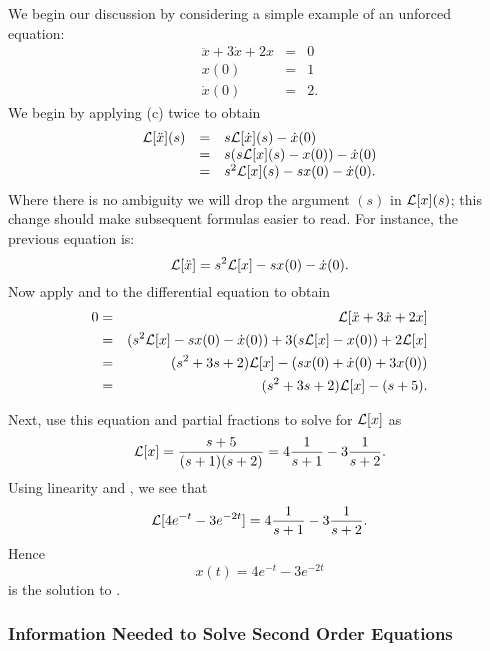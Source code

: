 \documentclass{ximera}
\begin{document}
We begin our discussion by considering a simple example of an unforced 
equation:
\begin{equation}  \label{Lexam2}
\begin{array}{rcl}
\ddot{x} + 3\dot{x} +2x & = & 0  \\
 x(0) & = & 1 \\
\dot{x}(0) & = & 2.
\end{array}
\end{equation}
We begin by applying (c) twice to obtain
\[
\begin{array}{rcl}
{\cal L}[\ddot{x}](s) & = & s{\cal L}[\dot{x}](s) - \dot{x}(0)\\
& = & s(s{\cal L}[x](s) - x(0)) - \dot{x}(0)\\
& = & s^2{\cal L}[x](s) - sx(0) - \dot{x}(0).
\end{array}
\]
Where there is no ambiguity we will drop the argument $(s)$ in 
${\cal L}[x](s)$; this change should make subsequent formulas easier 
to read.  For instance, the previous equation is:
\begin{equation}  \label{eq:dderLap}
{\cal L}[\ddot{x}] = s^2{\cal L}[x] - sx(0) - \dot{x}(0).
\end{equation}
Now apply  and  to the differential
equation  to obtain
\begin{eqnarray*}
0 & = & {\cal L}[\ddot{x} + 3\dot{x} +2x] \\
& = & (s^2{\cal L}[x] - sx(0) - \dot{x}(0)) + 
3(s{\cal L}[x] - x(0)) + 2{\cal L}[x]\\
& = & (s^2+3s+2){\cal L}[x] -(sx(0)+\dot{x}(0)+3x(0)) \\
& = & (s^2+3s+2){\cal L}[x] - (s+5).
\end{eqnarray*}

Next, use this equation and partial fractions to solve for ${\cal L}[x]$ as
\[
\displaystyle{\cal L}[x] = \frac{s+5}{(s+1)(s+2)} = 4\frac{1}{s+1} - 3\frac{1}{s+2}.
\]
Using linearity and , we see that 
\[
{\cal L}[4e^{-t}-3e^{-2t}] = 4\frac{1}{s+1} - 3\frac{1}{s+2}.
\]
Hence
\[
x(t) = 4e^{-t}-3e^{-2t}
\]
is the solution to .


\subsubsection*{Information Needed to Solve Second Order Equations}
\end{document}
